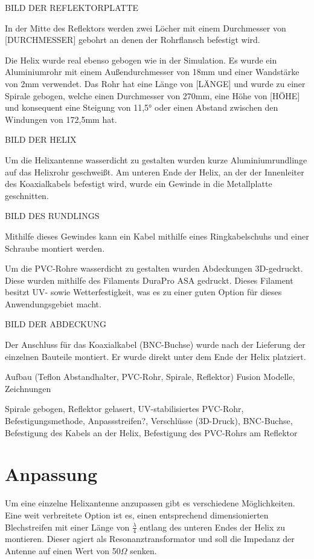 BILD DER REFLEKTORPLATTE

In der Mitte des Reflektors werden zwei Löcher mit einem Durchmesser von [DURCHMESSER] gebohrt an denen der Rohrflansch befestigt wird. 

Die Helix wurde real ebenso gebogen wie in der Simulation. Es wurde ein Aluminiumrohr mit einem Außendurchmesser von 18mm und einer Wandstärke von 2mm verwendet. Das Rohr hat eine Länge von [LÄNGE] und wurde zu einer Spirale gebogen, welche einen Durchmesser von 270mm, eine Höhe von [HÖHE] und konsequent eine Steigung von 11,5° oder einen Abstand zwischen den Windungen von 172,5mm hat.

BILD DER HELIX

Um die Helixantenne wasserdicht zu gestalten wurden kurze Aluminiumrundlinge auf das Helixrohr geschweißt. Am unteren Ende der Helix, an der der Innenleiter des Koaxialkabels befestigt wird, wurde ein Gewinde in die Metallplatte geschnitten.

BILD DES RUNDLINGS	

Mithilfe dieses Gewindes kann ein Kabel mithilfe eines Ringkabelschuhs und einer Schraube montiert werden.

Um die PVC-Rohre wasserdicht zu gestalten wurden Abdeckungen 3D-gedruckt. Diese wurden mithilfe des Filaments DuraPro ASA gedruckt. Dieses Filament besitzt UV- sowie Wetterfestigkeit, was es zu einer guten Option für dieses Anwendungsgebiet macht.

BILD DER ABDECKUNG

Der Anschluss für das Koaxialkabel (BNC-Buchse) wurde nach der Lieferung der einzelnen Bauteile montiert. Er wurde direkt unter dem Ende der Helix platziert. 

Aufbau (Teflon Abstandhalter, PVC-Rohr, Spirale, Reflektor) Fusion Modelle, Zeichnungen

Spirale gebogen, Reflektor gelasert, UV-stabilisiertes PVC-Rohr, Befestigungsmethode, Anpassstreifen?, Verschlüsse (3D-Druck), BNC-Buchse, Befestigung des Kabels an der Helix, Befestigung des PVC-Rohrs am Reflektor

\section{Anpassung}
Um eine einzelne Helixantenne anzupassen gibt es verschiedene Möglichkeiten. Eine weit verbreitete Option ist es, einen entsprechend dimensionierten Blechstreifen mit einer Länge von $\frac{\lambda}{4}$ entlang des unteren Endes der Helix zu montieren. Dieser agiert als Resonanztransformator und soll die Impedanz der Antenne auf einen Wert von 50$\Omega$ senken.

